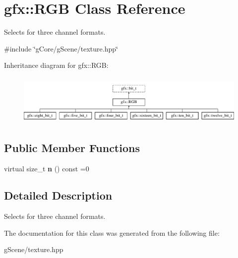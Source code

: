\hypertarget{classgfx_1_1RGB}{\section{gfx\-:\-:R\-G\-B Class Reference}
\label{classgfx_1_1RGB}
}


Selects for three channel formats.  




{\ttfamily \#include \char`\"{}g\-Core/g\-Scene/texture.\-hpp\char`\"{}}

Inheritance diagram for gfx\-:\-:R\-G\-B\-:\begin{figure}[H]
\begin{center}
\leavevmode
\includegraphics[height=2.500000cm]{classgfx_1_1RGB}
\end{center}
\end{figure}
\subsection*{Public Member Functions}
\begin{DoxyCompactItemize}
\item 
\hypertarget{classgfx_1_1RGB_aac0451a5d28cc5a4607086437ccb6965}{virtual size\-\_\-t {\bfseries n} () const =0}\label{classgfx_1_1RGB_aac0451a5d28cc5a4607086437ccb6965}

\end{DoxyCompactItemize}


\subsection{Detailed Description}
Selects for three channel formats. 

The documentation for this class was generated from the following file\-:\begin{DoxyCompactItemize}
\item 
g\-Scene/texture.\-hpp\end{DoxyCompactItemize}
